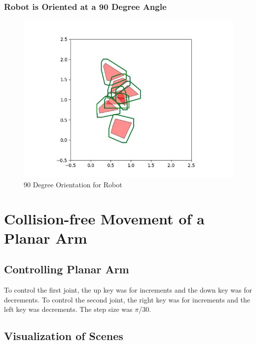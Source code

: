 \documentclass{article}
\begin{document}
\newpage
\subsubsection{Robot is Oriented at a 90 Degree Angle}
\begin{figure}[h!]
	\includegraphics[width= 0.9 \linewidth]{Problem3_minkowski8_90.jpg}
	\centering
	\caption{90 Degree Orientation for Robot}
	\label{Problem3_minkowski8_90.jpg}
\end{figure}


\newpage 
\section{Collision-free Movement of a Planar Arm}
\subsection{Controlling Planar Arm}
To control the first joint, the up key was for increments and the down key was for decrements. To control the second joint, the right key was for increments and the left key was decrements. The step size was $\pi$/30.
\subsection{Visualization of Scenes}
\end{document}

